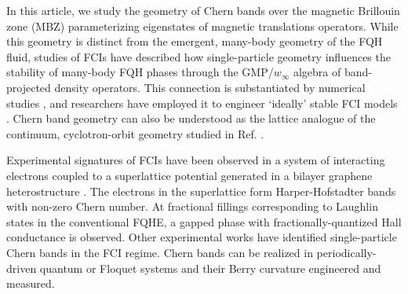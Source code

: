 \documentclass[aps,prb,twocolumn,letterpaper,twoside,nobalancelastpage,groupedaddress,amsmath,amssymb,floatfix,citeautoscript]{revtex4-1}
\begin{document}
 In this article, we study the geometry of Chern bands over the magnetic Brillouin zone (MBZ) parameterizing eigenstates of magnetic translations operators\cite{zak_magnetic_1964}. While this geometry is distinct from the emergent, many-body geometry of the FQH fluid, studies of FCIs have described how single-particle geometry influences the stability of many-body FQH phases through the GMP/$w_{\infty}$ algebra of band-projected density operators.\cite{Girvin:1986bu,parameswaran_fractional_2012,parameswaran_fractional_2013, roy_band_2014} This connection is substantiated by numerical studies \cite{jackson_geometric_2015,Claassen2015,bauer_quantum_2016}, and researchers have employed it to engineer `ideally' stable FCI models \cite{Lee2017}. Chern band geometry can also be understood as the lattice analogue of the continuum, cyclotron-orbit geometry studied in Ref. .

 Experimental signatures of FCIs have been observed in a system of interacting electrons coupled to a superlattice potential generated in a bilayer graphene heterostructure \cite{Spantoneaan8458}. The electrons in the superlattice form Harper-Hofstadter \cite{harper_general_1955,Azbel:1964tk,hofstadter_energy_1976} bands with non-zero Chern number. At fractional fillings corresponding to Laughlin states in the conventional FQHE, a gapped phase with fractionally-quantized Hall conductance is observed. \cite{Spantoneaan8458} Other experimental works have identified single-particle Chern bands in the FCI regime. \cite{Jotzu2014,Aidelsburger:2014hm,Aidelsburger:2013ew} Chern bands can be realized in periodically-driven quantum or Floquet systems and their Berry curvature engineered and measured.\cite{Flaschner1091}

\end{document}
